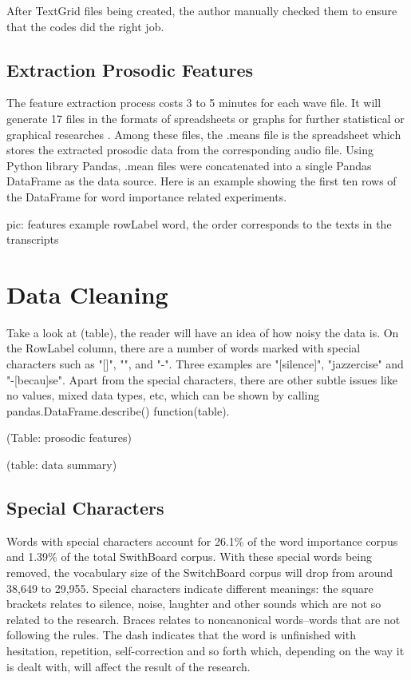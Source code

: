 After TextGrid files being created, the author manually checked them to ensure that the codes did the right job.

\subsection{Extraction Prosodic Features}
The feature extraction process costs 3 to 5 minutes for each wave file. It will generate 17 files in the formats of spreadsheets or graphs for further statistical or graphical researches \citep{Xu2013}. Among these files, the .means file is the spreadsheet which stores the extracted prosodic data from the corresponding audio file. Using Python library Pandas, .mean files were concatenated into a single Pandas DataFrame as the data source. Here is an example showing the first ten rows of the DataFrame for word importance related experiments.

pic: features example  rowLabel word, the order corresponds to the texts in the transcripts 

\section{Data Cleaning}
Take a look at (table), the reader will have an idea of how noisy the data is. On the RowLabel column, there are a number of words marked with special characters such as "[]", "{}", and "-". Three examples are "[silence]", "{jazzercise}" and "-[becau]se". Apart from the special characters, there are other subtle issues like no values, mixed data types, etc, which can be shown by calling pandas.DataFrame.describe() function(table).

(Table: prosodic features)

(table: data summary)

\subsection{Special Characters}
Words with special characters account for 26.1\% of the word importance corpus and 1.39\% of the total SwithBoard corpus. With these special words being removed, the vocabulary size of the SwitchBoard corpus will drop from around 38,649 to 29,955. Special characters indicate different meanings: the square brackets relates to silence, noise, laughter and other sounds which are not so related to the research. Braces relates to noncanonical words--words that are not following the rules. The dash indicates that the word is unfinished with hesitation, repetition, self-correction and so forth which, depending on the way it is dealt with, will affect the result of the research. 

